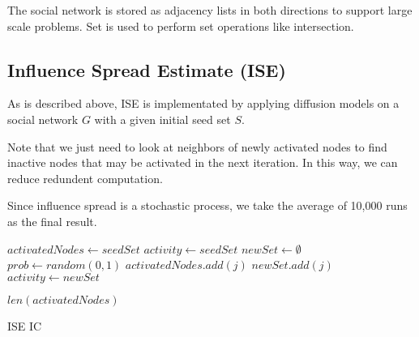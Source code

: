 \documentclass[conference]{IEEEtran}
\begin{document}
    The social network is stored as adjacency lists in both directions to support large scale problems. Set is used to perform set operations like intersection.

    \subsection{Influence Spread Estimate (ISE)}

    As is described above, ISE is implementated by applying diffusion models on a social network $G$ with a given initial seed set $S$. 

    Note that we just need to look at neighbors of newly activated nodes to find inactive nodes that may be activated in the next iteration. In this way, we can reduce redundent computation.

    Since influence spread is a stochastic process, we take the average of 10,000 runs as the final result.

    \begin{algorithm}[H]
        \begin{algorithmic}[1]
            \State $activatedNodes \gets seedSet$
            \State $activity \gets seedSet$
                \State $newSet \gets \emptyset$
                            \State $prob \gets random(0,1)$
                                \State $activatedNodes.add(j)$
                                \State $newSet.add(j)$
                            \EndIf
                        \EndIf
                    \EndFor
                \EndFor
                \State $activity \gets newSet$
            \EndWhile


            \Return $len(activatedNodes)$
            \EndFunction
        \end{algorithmic}
        \caption{ISE IC}
    \end{algorithm}
\end{document}
